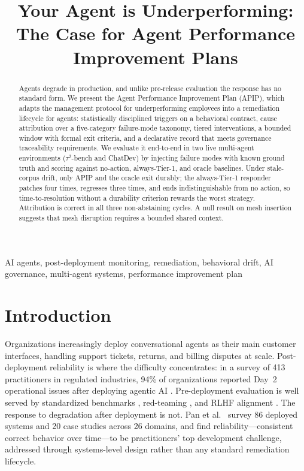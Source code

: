 \documentclass[conference]{IEEEtran}
\begin{document}
\title{Your Agent is Underperforming:\\
The Case for Agent Performance Improvement Plans}

\author{
}

\maketitle

\begin{abstract}
Agents degrade in production, and unlike pre-release evaluation the response
has no standard form. We present the Agent Performance Improvement Plan (APIP),
which adapts the management protocol for underperforming employees into a
remediation lifecycle for agents: statistically disciplined triggers on a
behavioral contract, cause attribution over a five-category failure-mode
taxonomy, tiered interventions, a bounded window with formal exit criteria, and
a declarative record that meets governance traceability requirements. We
evaluate it end-to-end in two live multi-agent environments ($\tau^2$-bench and
ChatDev) by injecting failure modes with known ground truth and scoring against
no-action, always-Tier-1, and oracle baselines. Under stale-corpus drift, only
APIP and the oracle exit durably; the always-Tier-1 responder patches four
times, regresses three times, and ends indistinguishable from no action, so
time-to-resolution without a durability criterion rewards the worst strategy.
Attribution is correct in all three non-abstaining cycles. A null result on
mesh insertion suggests that mesh disruption requires a bounded shared context.
\end{abstract}

\begin{IEEEkeywords}
AI agents, post-deployment monitoring, remediation, behavioral drift, AI
governance, multi-agent systems, performance improvement plan
\end{IEEEkeywords}

\section{Introduction}

Organizations increasingly deploy conversational agents as their main customer
interfaces, handling support tickets, returns, and billing disputes at scale.
Post-deployment reliability is where the difficulty concentrates: in a survey of 413 practitioners in regulated
industries, 94\% of organizations reported Day~2 operational issues after
deploying agentic AI \cite{datarobot2026}. Pre-deployment evaluation is well
served by standardized benchmarks \cite{liang2022}, red-teaming
\cite{ganguli2022}, and RLHF alignment \cite{ouyang2022}. The response to
degradation after deployment is not. Pan et al.\ \cite{pan2025} survey 86
deployed systems and 20 case studies across 26 domains, and find
reliability---consistent correct behavior over time---to be practitioners' top
development challenge, addressed through systems-level design rather than any
standard remediation lifecycle.
\end{document}
